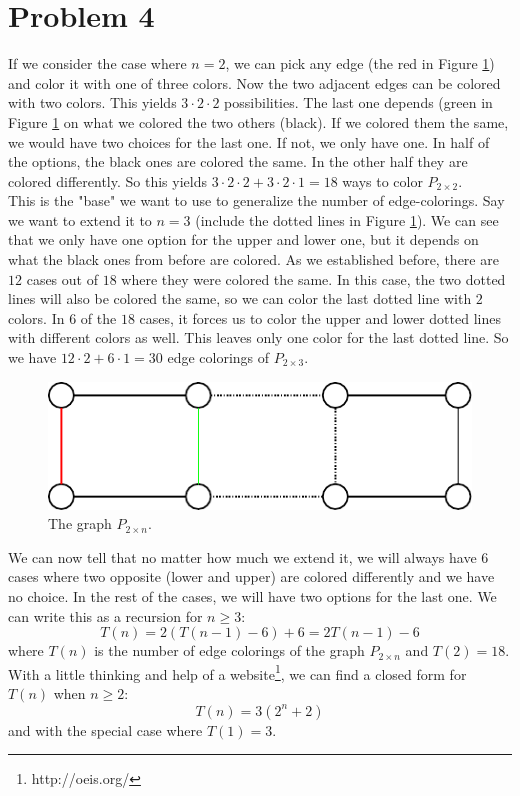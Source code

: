 \documentclass[a4paper]{article}
\begin{document}
\section{Problem 4}
If we consider the case where $n=2$, we can pick any edge (the red in Figure \ref{fig1}) and color it with one of three colors. Now the two adjacent edges can be colored with two colors. This yields $3\cdot 2\cdot 2$ possibilities. The last one depends (green in Figure \ref{fig1} on what we colored the two others (black). If we colored them the same, we would have two choices for the last one. If not, we only have one. In half of the options, the black ones are colored the same. In the other half they are colored differently. So this yields $3\cdot 2\cdot 2 + 3\cdot 2\cdot 1=18$ ways to color $P_{2\times 2}$. \\
This is the "base" we want to use to generalize the number of edge-colorings. Say we want to extend it to $n=3$ (include the dotted lines in Figure \ref{fig1}). We can see that we only have one option for the upper and lower one, but it depends on what the black ones from before are colored. As we established before, there are $12$ cases out of $18$ where they were colored the same. In this case, the two dotted lines will also be colored the same, so we can color the last dotted line with $2$ colors. In $6$ of the $18$ cases, it forces us to color the upper and lower dotted lines with different colors as well. This leaves only one color for the last dotted line. So we have $12\cdot 2+ 6\cdot 1 =30$ edge colorings of $P_{2\times 3}$.
\begin{figure}[H]
  \centering
  \captionsetup{justification=centering}
  \includegraphics[width=\textwidth]{fig1.pdf}
  \caption{The graph $P_{2\times n}$.}
  \label{fig1}
\end{figure}
We can now tell that no matter how much we extend it, we will always have $6$ cases where two opposite (lower and upper) are colored differently and we have no choice. In the rest of the cases, we will have two options for the last one. We can write this as a recursion for $n\geq 3$:
$$
T(n)=2(T(n-1)-6)+6=2T(n-1)-6
$$
where $T(n)$ is the number of edge colorings of the graph $P_{2\times n}$ and $T(2)=18$. With a little thinking and help of a website\footnote{http://oeis.org/}, we can find a closed form for $T(n)$ when $n\geq 2$:
$$
T(n)=3(2^n+2)
$$
and with the special case where $T(1)=3$.
\end{document}
